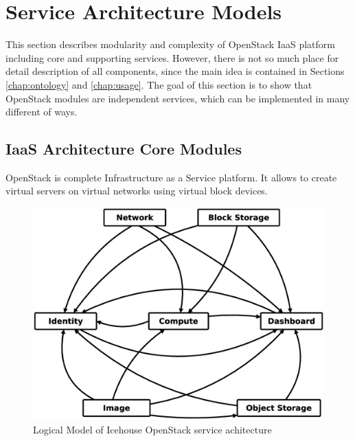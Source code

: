 
\section{Service Architecture Models}
\label{chap:service}



This section describes modularity and complexity of OpenStack IaaS platform including core and supporting services. However, there is not so much place for detail description of all components, since the main idea is contained in Sections \ref{chap:ontology} and \ref{chap:usage}. 
The goal of this section is to show that OpenStack modules are independent services, which can be implemented in many different of ways. 

\subsection{IaaS Architecture Core Modules}

OpenStack is complete Infrastructure as a Service platform. It allows to create virtual servers on virtual networks using virtual block devices.

\begin{figure}[h]
\centering
\includegraphics[scale=.13]{img/openstack_logical_model.eps}
\caption{Logical Model of Icehouse OpenStack service achitecture}
\label{fig:modules}
\end{figure}

